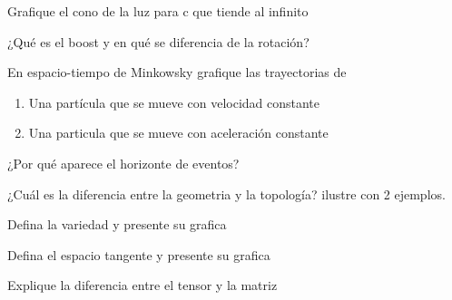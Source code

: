\documentclass[12pt,a4paper]{practice}
\begin{document}
    \begin{problem}\label{prob:7}
        Grafique el cono de la luz para c que tiende al infinito    
    \end{problem}

    \begin{problem}\label{prob:8}
        ¿Qué es el boost y en qué se diferencia de la rotación?
    \end{problem}

    \begin{problem}\label{prob:9}
        En espacio-tiempo de Minkowsky grafique las trayectorias de
            \begin{enumerate}[label=(\alph*)]
                \item Una partícula que se mueve con velocidad constante
                \item Una particula que se mueve con aceleración constante
             \end{enumerate}  
    \end{problem}
    
    \begin{problem}\label{prob:10}
        ¿Por qué aparece el horizonte de eventos?    
    \end{problem}
    
    \begin{problem}\label{prob:11}
        ¿Cuál es la diferencia entre la geometria y la topología? ilustre con 2 ejemplos.
    \end{problem}
    
    \begin{problem}\label{prob:12}
        Defina la variedad y presente su grafica    
    \end{problem}
    
    \begin{problem}\label{prob:13}
        Defina el espacio tangente y presente su grafica
    \end{problem}
    
    \begin{problem}\label{prob:14}
        Explique la diferencia entre el tensor y la matriz
    \end{problem}
    
\end{document}
